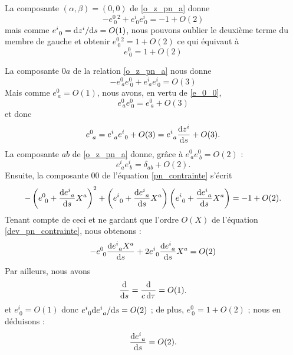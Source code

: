 			La composante $(\alpha,\beta)=(0,0)$ de \ref{o_z_pn_a} donne 
			\begin{equation}
				-e^0_{\ 0}^2 + e^i_{\ 0}e^i_{\ 0} = -1 + O(2)	
			\end{equation}
			mais comme $e^i_{\ 0}=\mathrm{d} z^i / \mathrm{d} s = O(1)$, nous pouvons oublier le deuxième terme du membre de gauche et obtenir $e^0_{\ 0}^2=1+O(2)$ ce qui équivaut à 
			\begin{equation}\label{e_0_0}
				e^0_{\ 0}=1+O(2)	
			\end{equation}

			La composante $0a$ de la relation \ref{o_z_pn_a} nous donne
			\begin{equation}
				-e^0_{\ a}e^0_{\ 0}+e^i_{\ a}e^i_{\ 0}=O(3)
			\end{equation}
			Mais comme $e^0_{\ a}=O(1)$, nous avons, en vertu de \ref{e_0_0},
			\begin{equation}
				e^0_{\ a}e^0_{\ 0}=e^0_{\ a}+O(3)
			\end{equation}
			et donc
			\begin{equation}
				e^0_{\ a}=e^i_{\ a}e^i_{\ 0}+O(3)=e^i_{\ a}\frac{\d z^i}{\d s} + O(3).
			\end{equation}
			La composante $ab$ de \ref{o_z_pn_a} donne, grâce à $e^0_{\ a}e^0_{\ b}=O(2)$ :
			\begin{equation}
				e^i_{\ a}e^i_{\ b}=\delta_{ab}+O(2). \label{rotation_ab}
			\end{equation}
			Ensuite, la composante $00$ de l'équation  \ref{pn_contrainte} s'écrit
			\begin{equation}\label{dev_pn_contrainte}
				-\left(e^0_{\ 0}+ \frac{\mathrm{d} e^i_{\ a}}{\mathrm{d} s} X^a \right)^2 + \left( e^i_{\ 0} + \frac{\mathrm{d} e^i_{\ a}}{\mathrm{d} s} X^a \right)\left( e^i_{\ 0} + \frac{\mathrm{d} e^i_{\ a}}{\mathrm{d} s} X^a \right)=-1+O(2).
			\end{equation}
			Tenant compte de ceci et ne gardant que l'ordre $O(X)$ de l'équation \ref{dev_pn_contrainte}, nous obtenons :
			\begin{equation}
				-e^0_{\ 0}\frac{\d e^i_{\ a}X^a}{\d s} + 2 e^i_{\ 0}\frac{\d e^i_{\ a}}{\d s}X^a=O(2)
			\end{equation}
			Par ailleurs, nous avons
			\begin{equation}
				\frac{\mathrm{d}}{\mathrm{d} s}=\frac{\mathrm{d}}{c\, \mathrm{d} \tau}=O(1).
			\end{equation}
			et $e^i_{\ 0}=O(1)$ donc $e^i_{\ 0}\mathrm{d} e^i_{\ a}/\mathrm{d} s=O(2)$ ; de plus, $e^0_{\ 0}=1+O(2)$ ; nous en déduisons :
			\begin{equation}
				\frac{\d e^i_{\ a}}{\d s}=O(2).
			\end{equation}

